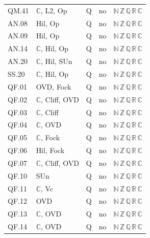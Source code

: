 {\begin{longtable}{l p{6.8cm} c c l}
QM.41 & $\mathbb C$, \textsf{L2}, \textsf{Op} & Q & no & $\mathbb N\,\mathbb Z\,\mathbb Q\,\mathbb R\,\mathbb C$ \\
AN.08 & \textsf{Hil}, \textsf{Op} & Q & no & $\mathbb N\,\mathbb Z\,\mathbb Q\,\mathbb R\,\mathbb C$ \\
AN.09 & \textsf{Hil}, \textsf{Op} & Q & no & $\mathbb N\,\mathbb Z\,\mathbb Q\,\mathbb R\,\mathbb C$ \\
AN.14 & $\mathbb C$, \textsf{Hil}, \textsf{Op} & Q & no & $\mathbb N\,\mathbb Z\,\mathbb Q\,\mathbb R\,\mathbb C$ \\
AN.20 & $\mathbb C$, \textsf{Hil}, \textsf{SUn} & Q & no & $\mathbb N\,\mathbb Z\,\mathbb Q\,\mathbb R\,\mathbb C$ \\
SS.20 & $\mathbb C$, \textsf{Hil}, \textsf{Op} & Q & no & $\mathbb N\,\mathbb Z\,\mathbb Q\,\mathbb R\,\mathbb C$ \\
QF.01 & \textsf{OVD}, \textsf{Fock} & Q & no & $\mathbb N\,\mathbb Z\,\mathbb Q\,\mathbb R\,\mathbb C$ \\
QF.02 & $\mathbb C$, \textsf{Cliff}, \textsf{OVD} & Q & no & $\mathbb N\,\mathbb Z\,\mathbb Q\,\mathbb R\,\mathbb C$ \\
QF.03 & $\mathbb C$, \textsf{Cliff} & Q & no & $\mathbb N\,\mathbb Z\,\mathbb Q\,\mathbb R\,\mathbb C$ \\
QF.04 & $\mathbb C$, \textsf{OVD} & Q & no & $\mathbb N\,\mathbb Z\,\mathbb Q\,\mathbb R\,\mathbb C$ \\
QF.05 & $\mathbb C$, \textsf{Fock} & Q & no & $\mathbb N\,\mathbb Z\,\mathbb Q\,\mathbb R\,\mathbb C$ \\
QF.06 & \textsf{Hil}, \textsf{Fock} & Q & no & $\mathbb N\,\mathbb Z\,\mathbb Q\,\mathbb R\,\mathbb C$ \\
QF.07 & $\mathbb C$, \textsf{Cliff}, \textsf{OVD} & Q & no & $\mathbb N\,\mathbb Z\,\mathbb Q\,\mathbb R\,\mathbb C$ \\
QF.10 & \textsf{SUn} & Q & no & $\mathbb N\,\mathbb Z\,\mathbb Q\,\mathbb R\,\mathbb C$ \\
QF.11 & $\mathbb C$, \textsf{Vc} & Q & no & $\mathbb N\,\mathbb Z\,\mathbb Q\,\mathbb R\,\mathbb C$ \\
QF.12 & \textsf{OVD} & Q & no & $\mathbb N\,\mathbb Z\,\mathbb Q\,\mathbb R\,\mathbb C$ \\
QF.13 & $\mathbb C$, \textsf{OVD} & Q & no & $\mathbb N\,\mathbb Z\,\mathbb Q\,\mathbb R\,\mathbb C$ \\
QF.14 & $\mathbb C$, \textsf{OVD} & Q & no & $\mathbb N\,\mathbb Z\,\mathbb Q\,\mathbb R\,\mathbb C$ \\

\end{longtable}}
